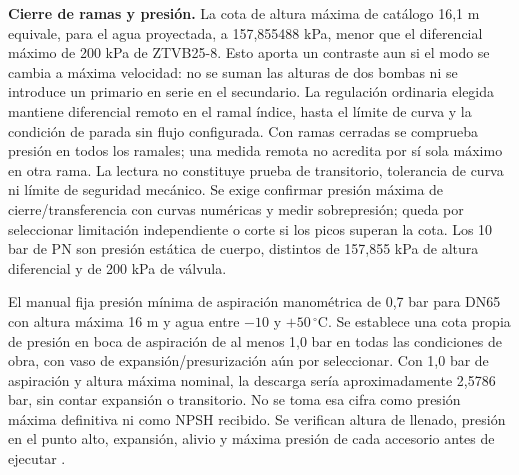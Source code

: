 \textbf{Cierre de ramas y presión.} La cota de altura máxima de catálogo 16,1 m equivale, para el agua proyectada, a 157,855488 kPa, menor que el diferencial máximo de 200 kPa de ZTVB25-8. Esto aporta un contraste aun si el modo se cambia a máxima velocidad: no se suman las alturas de dos bombas ni se introduce un primario en serie en el secundario. La regulación ordinaria elegida mantiene diferencial remoto en el ramal índice, hasta el límite de curva y la condición de parada sin flujo configurada. Con ramas cerradas se comprueba presión en todos los ramales; una medida remota no acredita por sí sola máximo en otra rama. La lectura no constituye prueba de transitorio, tolerancia de curva ni límite de seguridad mecánico. Se exige confirmar presión máxima de cierre/transferencia con curvas numéricas y medir sobrepresión; queda por seleccionar limitación independiente o corte si los picos superan la cota. Los 10 bar de PN son presión estática de cuerpo, distintos de 157,855 kPa de altura diferencial y de 200 kPa de válvula.

El manual fija presión mínima de aspiración manométrica de 0,7 bar para DN65 con altura máxima 16 m y agua entre $-10$ y $+50\,^{\circ}$C. Se establece una cota propia de presión en boca de aspiración de al menos 1,0 bar en todas las condiciones de obra, con vaso de expansión/presurización aún por seleccionar. Con 1,0 bar de aspiración y altura máxima nominal, la descarga sería aproximadamente 2,5786 bar, sin contar expansión o transitorio. No se toma esa cifra como presión máxima definitiva ni como NPSH recibido. Se verifican altura de llenado, presión en el punto alto, expansión, alivio y máxima presión de cada accesorio antes de ejecutar \parencite[p.~15]{lote37-wilo-instalacion}.

